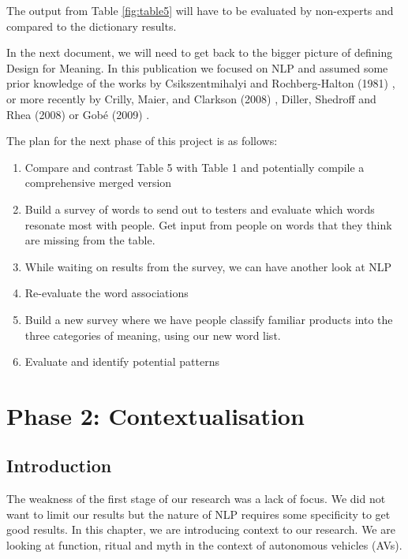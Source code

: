 \documentclass[12pt, usenames, dvipsnames]{report}
\begin{document}
\begin{flushleft}
The output from Table \ref{fig:table5} will have to be evaluated by non-experts and compared to the dictionary results.

In the next document, we will need to get back to the bigger picture of defining Design for Meaning.
In this publication we focused on NLP and assumed some prior knowledge of the works by Csikszentmihalyi and Rochberg-Halton (1981) \cite{csikszentmihalyi1981}, or more recently by Crilly, Maier, and Clarkson (2008) \cite{crilly2008}, Diller, Shedroff and Rhea (2008) \cite{diller2008} or Gobé (2009) \cite{gobe2009}.

The plan for the next phase of this project is as follows:

\begin{enumerate}
	\item Compare and contrast Table 5 with Table 1 and potentially compile a comprehensive merged version
	\item Build a survey of words to send out to testers and evaluate which words resonate most with people. Get input from people on words that they think are missing from the table.
	\item While waiting on results from the survey, we can have another look at NLP
	\item Re-evaluate the word associations
	\item Build a new survey where we have people classify familiar products into the three categories of meaning, using our new word list.
	\item Evaluate and identify potential patterns
\end{enumerate}


\chapter{Phase 2: Contextualisation}

\section*{Introduction}

The weakness of the first stage of our research was a lack of focus.
We did not want to limit our results but the nature of NLP requires some specificity to get good results.
In this chapter, we are introducing context to our research.
We are looking at function, ritual and myth in the context of autonomous vehicles (AVs).


\end{flushleft}
\end{document}
